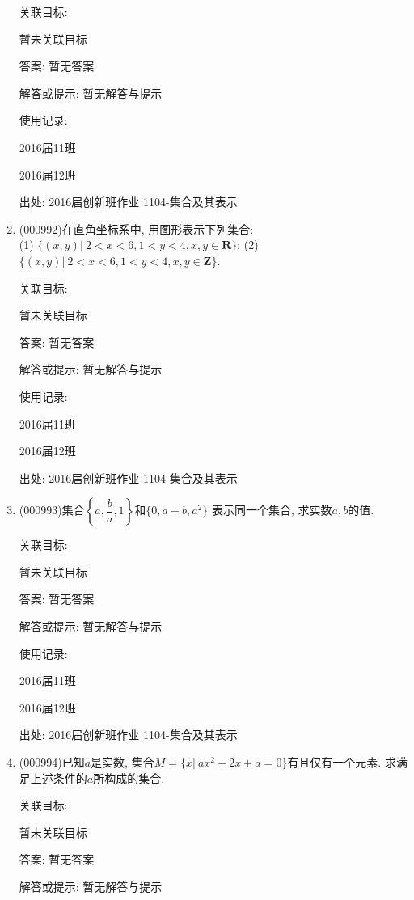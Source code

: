 \documentclass[10pt,a4paper]{article}
\begin{document}
\begin{enumerate}[1.]
关联目标:

暂未关联目标

答案: 暂无答案

解答或提示: 暂无解答与提示

使用记录:

2016届11班		

2016届12班		


出处: 2016届创新班作业	1104-集合及其表示
\item { (000992)}在直角坐标系中, 用图形表示下列集合:\\ 
(1) $\{(x,y)|\ 2<x<6,1<y<4,x,y\in\mathbf{R}\}$; \hfill (2) $\{(x,y)|\ 2<x<6,1<y<4,x,y\in\mathbf{Z}\}$.


关联目标:

暂未关联目标

答案: 暂无答案

解答或提示: 暂无解答与提示

使用记录:

2016届11班		

2016届12班		


出处: 2016届创新班作业	1104-集合及其表示
\item { (000993)}集合$\left\{a,\dfrac{b}{a},1\right\}$和$\{0,a+b,a^2\}$ 表示同一个集合, 求实数$a,b$的值.


关联目标:

暂未关联目标

答案: 暂无答案

解答或提示: 暂无解答与提示

使用记录:

2016届11班	

2016届12班	


出处: 2016届创新班作业	1104-集合及其表示
\item { (000994)}已知$a$是实数, 集合$M=\{x|\ ax^2+2x+a=0\}$有且仅有一个元素. 求满足上述条件的$a$所构成的集合.


关联目标:

暂未关联目标

答案: 暂无答案

解答或提示: 暂无解答与提示


\end{enumerate}
\end{document}
